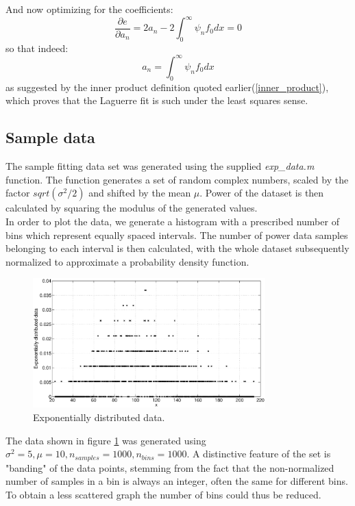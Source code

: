 \documentclass[a4paper]{article}
\numberwithin{equation}{section}
\begin{document}
\noindent And now optimizing for the coefficients:
\begin{equation}
\frac{\partial e}{\partial a_n} = 2a_n - 2 \int_{0}^{\infty} \psi_nf_0dx = 0
\end{equation}
so that indeed:
\begin{equation}
a_n = \int_{0}^{\infty} \psi_nf_0dx
\end{equation}
as suggested by the inner product definition quoted earlier(\ref{inner_product}), which proves that the Laguerre fit is such under the least squares sense.

\subsection{Sample data}
The sample fitting data set was generated using the supplied \textit{exp\_data.m} function.
The function generates a set of random complex numbers, scaled by the factor $sqrt(\sigma^2/2)$ and shifted by the mean $\mu$. Power of the dataset is then calculated by squaring the modulus of the generated values. \\
In order to plot the data, we generate a histogram with a prescribed number of bins which represent equally spaced intervals. The number of power data samples belonging to each interval is then calculated, with the whole dataset subsequently normalized to approximate a probability density function.

\begin{figure}
\centering
\includegraphics[width=0.8\textwidth]{exp_data.eps}
\caption{\label{fig:expdata}Exponentially distributed data.}
\end{figure}

\noindent The data shown in figure \ref{fig:expdata} was generated using $\sigma^2=5, \mu=10, n_{samples} = 1000, n_{bins} = 1000$. A distinctive feature of the set is "banding" of the data points, stemming from the fact that the non-normalized number of samples in a bin is always an integer, often the same for different bins. To obtain a less scattered graph the number of bins could thus be reduced.
\end{document}

